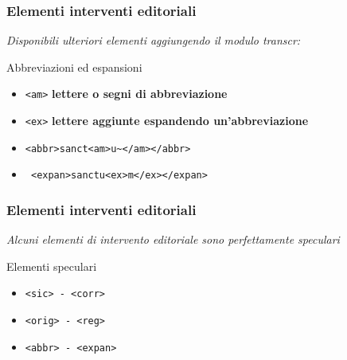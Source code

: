 \begin{frame}
    \frametitle{Elementi interventi editoriali}
    \addtocounter{nframe}{1}
    
    \textit{Disponibili ulteriori elementi aggiungendo il modulo transcr:}
    \begin{block}{Abbreviazioni ed espansioni}
        \begin{itemize}
            \item \texttt{<am>} \textbf{lettere o segni di abbreviazione}
            \item \texttt{<ex>} \textbf{lettere aggiunte espandendo un’abbreviazione}
            \item[] \texttt{<abbr>sanct<am>\texttt{u\~{}}</am></abbr>}
            \item[] \texttt{ <expan>sanctu<ex>m</ex></expan>}
        \end{itemize}
        
    \end{block}
    
\end{frame}
 

 \begin{frame}
    \frametitle{Elementi interventi editoriali}
    \addtocounter{nframe}{1}
    

    \textit{Alcuni elementi di intervento editoriale sono perfettamente speculari}
    \begin{block}{Elementi speculari}
        \begin{itemize}
            \item \texttt{<sic> - <corr>} 
            \item \texttt{<orig> - <reg>}
            \item \texttt{<abbr> - <expan>}
        \end{itemize}
        
    \end{block}
    
\end{frame}

